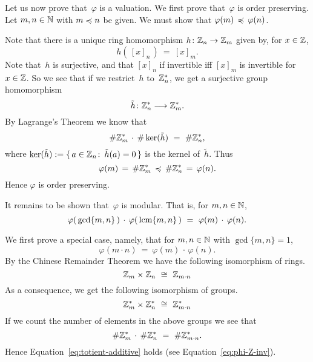 \documentclass[main.tex]{subfiles}
\begin{document}
\begin{ex}
Let us now prove that~$\varphi$ is a valuation.
We first prove that~$\varphi$ is order preserving.
Let $m,n\in \mathbb{N}$ with $m\preccurlyeq n$ be given.
We must show that $\varphi(m) \,\preccurlyeq\, \varphi(n)$.

Note that there is a unique ring homomorphism
$h\colon \mathbb{Z}_{n}\rightarrow \mathbb{Z}_{m}$
given by,
for $x\in \mathbb{Z}$,
\begin{equation*}
h(\,[x]_n\,) \ =\ [x]_m.
\end{equation*}
Note that~$h$ is surjective,
and that $[x]_n$ if invertible iff $[x]_m$ is invertible
for $x\in \mathbb{Z}$.
So we see that if we restrict~$h$ to~$\mathbb{Z}_{n}^*$,
we get a surjective group homomorphism
\begin{equation*}
\tilde{h}\colon \mathbb{Z}_{n}^* \longrightarrow \mathbb{Z}_{m}^*.
\end{equation*}
By Lagrange's Theorem we know that
\begin{equation*}
\# \mathbb{Z}_{m}^*  \,\cdot\, \# \ker(\tilde h) \ =\ \# \mathbb{Z}_{n}^*,
\end{equation*}
where $\ker(\tilde{h}) 
:=\smash{\{\, a\in \mathbb{Z}_{n} \colon \,\tilde{h}(a)=0\,\}}$
is the kernel of~$\tilde{h}$.
Thus
\begin{equation*}
\varphi(m) \,=\,
\# \mathbb{Z}_{m}^*  \,\preccurlyeq\,
 \# \mathbb{Z}_{n}^*
\,=\,\varphi(n).
\end{equation*}
Hence $\varphi$ is order preserving.

It remains to be shown that~$\varphi$
is modular. That is,
for $m,n\in\mathbb{N}$,
\begin{equation}
\label{eq:totient-modular}
\varphi(\,\gcd\{m,n\}\,) \,\cdot\, \varphi(\,\lcm\{m,n\}\,)
\ =\ 
\varphi(m) \,\cdot\,\varphi(n).
\end{equation}

We first prove a special case,
namely,
that for $m,n\in\mathbb{N}$ with $\gcd\{m,n\}=1$,
\begin{equation}
\label{eq:totient-additive}
\varphi(m\cdot n) \ =\ \varphi(m)\,\cdot\,\varphi(n).
\end{equation}
By the Chinese Remainder Theorem we 
have the following isomorphism of rings.
\begin{equation*}
\Zmod{m} \times \Zmod{n} \ \cong\ \Zmod{m\cdot n}
\end{equation*}
As a consequence, we get the following
isomorphism of groups.
\begin{equation*}
\mathbb{Z}_{m}^* \times \mathbb{Z}_{n}^* \ \cong\ \mathbb{Z}_{m\cdot n}^*
\end{equation*}
If we count the number of elements in the above
groups we see that
\begin{equation*}
\#\Zmod{m}^* \,\cdot\, \#\Zmod{n}^* \ =\ \#\Zmod{m\cdot n}^*.
\end{equation*}
Hence Equation~\eqref{eq:totient-additive}
holds (see Equation~\eqref{eq:phi-Z-inv}).


\end{ex}
\end{document}
